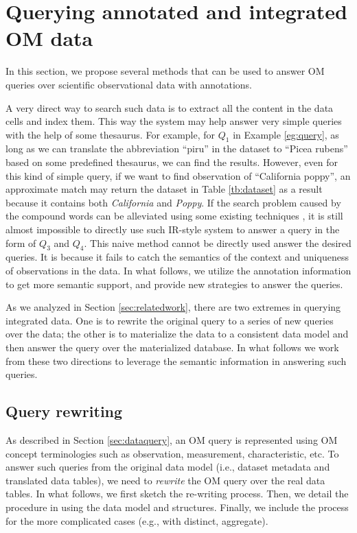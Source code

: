 \section{Querying annotated and integrated OM data}

In this section, we propose several methods that can be used to
answer OM queries over scientific observational data with
annotations.

A very direct way to search such data is to extract all the content in
the data cells and index them. This way the system may help answer
very simple queries with the help of some thesaurus.
For example, for $Q_1$ in Example \ref{eg:query}, as long as we can
translate the abbreviation ``piru'' in the dataset to ``Picea rubens''
based on some predefined thesaurus, we can find the results.
However, even for this kind of simple query, if we want to find
observation of ``California poppy'', an approximate match may return
the dataset in Table \ref{tb:dataset} as a result because it contains
both {\em California} and {\em Poppy}.
If the search problem caused by the compound words can be alleviated using some existing
techniques \cite{***}, %
it is still almost impossible to directly use such IR-style system to answer a query
in the form of $Q_3$ and $Q_4$.
This naive method cannot be directly used answer the desired queries. It is because it
fails to catch the semantics of the context and uniqueness of observations in the data.
In what follows, we utilize the annotation information to get
more semantic support, and provide new strategies to answer the
queries.

As we analyzed in Section \ref{sec:relatedwork}, there are two extremes
in querying integrated data.
One is to rewrite the original query to a series of new queries over
the data; the other is to materialize the data to a consistent data
model and then answer the query over the materialized database.
In what follows we work from these two directions to leverage the
semantic information in answering such queries.

\subsection{Query rewriting}\label{sec:queryrewrite}

As described in Section \ref{sec:dataquery},
an OM query is represented using
OM concept terminologies such as observation,
measurement, characteristic, etc.
To answer such queries from the original data model (i.e., dataset
metadata and translated data tables),
we need to {\em rewrite} the OM query over the real data tables.
In what follows, we first sketch the re-writing process.
Then, we detail the procedure in using the data model and structures.
Finally, we include the process for the more complicated
cases (e.g., with distinct, aggregate).

